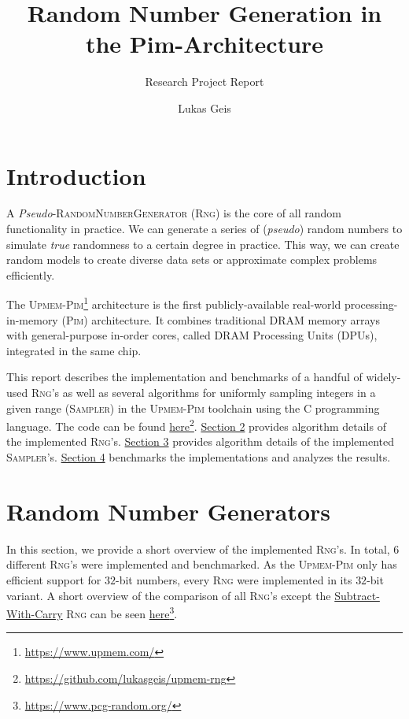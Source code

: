 \documentclass[a4paper]{scrartcl}
\title{Random Number Generation in the Pim-Architecture}
\subtitle{Research Project Report}
\author{Lukas Geis}
\date{}
\begin{document}
\maketitle
\tableofcontents

\newpage
\section{Introduction} \label{sec:1}
A \emph{Pseudo}-\textsc{RandomNumberGenerator} (\textsc{Rng}) is the core of all random functionality in practice.
We can generate a series of (\emph{pseudo}) random numbers to simulate \emph{true} randomness to a certain degree in practice.
This way, we can create random models to create diverse data sets or approximate complex problems efficiently.

The \textsc{Upmem-Pim}\footnote{\url{https://www.upmem.com/}} architecture is the first publicly-available real-world processing-in-memory (\textsc{Pim}) architecture.
It combines traditional DRAM memory arrays with general-purpose in-order cores, called DRAM Processing Units (DPUs), integrated in the same chip.

This report describes the implementation and benchmarks of a handful of widely-used \textsc{Rng}'s as well as several algorithms for uniformly sampling integers in a given range (\textsc{Sampler}) in the \textsc{Upmem-Pim} toolchain using the C programming language.
The code can be found \href{https://github.com/lukasgeis/upmem-rng}{here}\footnote{\url{https://github.com/lukasgeis/upmem-rng}}.
\hyperref[sec:2]{Section 2} provides algorithm details of the implemented \textsc{Rng}'s.
\hyperref[sec:3]{Section 3} provides algorithm details of the implemented \textsc{Sampler}'s.
\hyperref[sec:4]{Section 4} benchmarks the implementations and analyzes the results.


\section{Random Number Generators} \label{sec:2}
In this section, we provide a short overview of the implemented \textsc{Rng}'s.
In total, $6$ different \textsc{Rng}'s were implemented and benchmarked.
As the \textsc{Upmem-Pim} only has efficient support for $32$-bit numbers, every \textsc{Rng} were implemented in its $32$-bit variant.
A short overview of the comparison of all \textsc{Rng}'s except the \hyperref[sec:2.3]{Subtract-With-Carry} \textsc{Rng} can be seen \href{https://www.pcg-random.org/}{here}\footnote{\url{https://www.pcg-random.org/}}.
\end{document}
